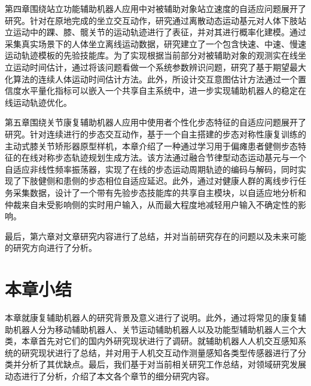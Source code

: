 第四章围绕站立功能辅助机器人应用中对被辅助对象站立速度的自适应问题展开了研究。针对在原地完成的坐立交互动作，研究通过离散动态运动基元对人体下肢站立运动中的踝、膝、髋关节的运动轨迹进行了表征，并对其进行概率化建模。通过采集真实场景下的人体坐立离线运动数据，研究建立了一个包含快速、中速、慢速运动轨迹模板的先验技能库。为了实现根据当前部分对被辅助对象的观测实在线坐立运动时间估计，通过将该问题看做一个系统参数辨识问题，研究了基于期望最大化算法的连续人体运动时间估计方法。此外，所设计交互意图估计方法通过一个置信度水平量化指标可以嵌入一个共享自主系统中，进一步实现辅助机器人的稳定在线运动轨迹优化。

第五章围绕关节康复辅助机器人应用中使用者个性化步态特征的自适应问题展开了研究。针对连续进行的步态交互动作，基于一个自主搭建的步态对称性康复训练的主动式膝关节矫形器原型样机，本章介绍了一种通过学习用于偏瘫患者健侧步态特征的在线对称步态轨迹规划生成方法。该方法通过融合节律型动态运动基元与一个自适应非线性频率振荡器，实现了在线的步态运动周期轨迹的编码与解码，同时实现了下肢健侧和患侧的步态相位自适应延迟。此外，通过对健康人群的离线步行任务采集数据，设计了一个带有先验步态技能库的共享自主模块，以自适应地分析和仲裁来自未受影响侧的实时用户输入，从而最大程度地减轻用户输入不确定性的影响。

最后，第六章对文章研究内容进行了总结，并对当前研究存在的问题以及未来可能的研究方向进行了分析。

\section{本章小结}
本章就康复辅助机器人的研究背景及意义进行了说明。此外，通过将常见的康复辅助机器人分为移动辅助机器人、关节运动辅助机器人以及功能型辅助机器人三个大类，本章首先对它们的国内外研究现状进行了调研。就辅助机器人人机交互感知系统的研究现状进行了总结，并对用于人机交互动作测量感知各类型传感器进行了分类并分析了其优缺点。最后，我们基于对当前相关研究工作总结，对领域研究发展动态进行了分析，介绍了本文各个章节的细分研究内容。
